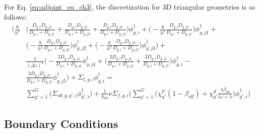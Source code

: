 For Eq. \ref{eq:adjoint_eq_ch3}, the discretization for 3D triangular geometries is as follows:
\begin{equation}
        \begin{aligned}
                \biggl( \frac{8}{h^2} &\biggl( \frac{D_{g,i}D_{g,j1}}{D_{g,i}+D_{g,j1}} + \frac{D_{g,i}D_{g,j2}}{D_{g,i}+D_{g,j2}} + \frac{D_{g,i}D_{g,j3}}{D_{g,i}+D_{g,j3}} \biggr) \phi_{g,i}^{\dagger} + \biggl(-\frac{8}{h^2}\frac{D_{g,i}D_{g,j1}}{D_{g,i}+D_{g,j1}}\biggr) \phi_{g,j1}^{\dagger} + \\ 
               &\biggl(-\frac{8}{h^2}\frac{D_{g,i}D_{g,j2}}{D_{g,i}+D_{g,j2}}\biggr) \phi_{g,j2}^{\dagger} + \biggl(-\frac{8}{h^2}\frac{D_{g,i}D_{g,j3}}{D_{g,i}+D_{g,j3}}\biggr) \phi_{g,j3}^{\dagger} \biggr) + \\ 
                &\frac{1}{(\Delta z)^2} \biggl( -\frac{2D_{g,i}D_{g,j4}}{D_{g,i}+D_{g,j4}} \phi_{g,j4}^{\dagger} + \biggl(\frac{2D_{g,i}D_{g,j4}}{D_{g,i}+D_{g,j4}}+\frac{2D_{g,i}D_{g,j5}}{D_{g,i}+D_{g,j5}}\biggr) \phi_{g,i}^{\dagger} - \\
                &\frac{2D_{g,i}D_{g,j5}}{D_{g,i}+D_{g,j5}} \phi_{g,j5}^{\dagger} \biggr) + \Sigma_{t,g,i} \phi_{g,i}^{\dagger} =  \\
                &\sum_{g' = 1}^{G} \biggl(\Sigma_{s0,g,g',i} \phi_{g',i}^{\dagger} \biggr) + \frac{1}{k_{\text{eff}}} \nu \Sigma_{f,g,i} \biggl( \sum_{g' = 1}^{G} \biggl( \chi^p_{g'} (1-\beta_{\text{eff}}) + \chi^d_{g'} \frac{\lambda \beta_{\text{eff}}}{i \omega + \lambda} \biggr) \phi_{g',i}^{\dagger} \biggr)
        \end{aligned}
        \label{eq:adjoint_3D_tri_disc}
\end{equation}

\subsection{Boundary Conditions}

